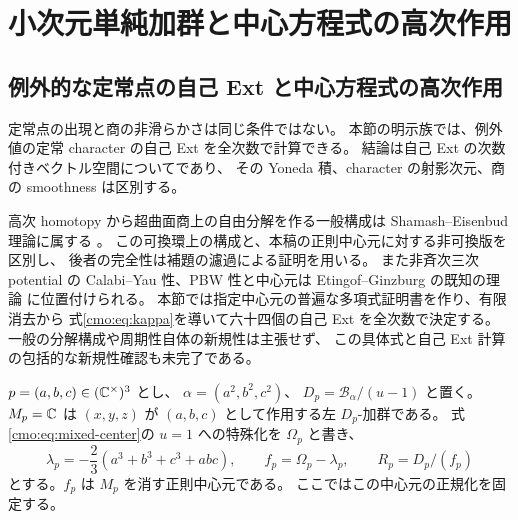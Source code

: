 \section{小次元単純加群と中心方程式の高次作用}
\label{mix:sec:modules}

\subsection{例外的な定常点の自己 Ext と中心方程式の高次作用}
\label{cmo:subsec:character-ext}

定常点の出現と商の非滑らかさは同じ条件ではない。
本節の明示族では、例外値の定常 character の自己 Ext を全次数で計算できる。
結論は自己 Ext の次数付きベクトル空間についてであり、
その Yoneda 積、character の射影次元、商の smoothness は区別する。

高次 homotopy から超曲面商上の自由分解を作る一般構成は
Shamash--Eisenbud 理論に属する
\cite[Theorem~7.2]{NFMEisenbudCI}。
この可換環上の構成と、本稿の正則中心元に対する非可換版を区別し、
後者の完全性は補題の濾過による証明を用いる。
また非斉次三次 potential の Calabi--Yau 性、PBW 性と中心元は
Etingof--Ginzburg の既知の理論
\cite[Theorem~3.3.2, Sections~3.4,~8.3]{NFMEG}に位置付けられる。
本節では指定中心元の普遍な多項式証明書を作り、有限消去から
式\eqref{cmo:eq:kappa}を導いて六十四個の自己 Ext を全次数で決定する。
一般の分解構成や周期性自体の新規性は主張せず、
この具体式と自己 Ext 計算の包括的な新規性確認も未完了である。

$p=(a,b,c)\in(\mathbb C^\times)^3$ とし、
$\alpha=(a^2,b^2,c^2)$、
$D_p=\mathcal B_\alpha/(u-1)$ と置く。
$M_p=\mathbb C$ は $(x,y,z)$ が $(a,b,c)$ として作用する左 $D_p$-加群である。
式\eqref{cmo:eq:mixed-center}の $u=1$ への特殊化を $\Omega_p$ と書き、
\begin{equation}\label{cmo:eq:character-value}
 \lambda_p=-\frac23(a^3+b^3+c^3+abc),\qquad
 f_p=\Omega_p-\lambda_p,\qquad R_p=D_p/(f_p)
\end{equation}
とする。$f_p$ は $M_p$ を消す正則中心元である。
ここではこの中心元の正規化を固定する。

